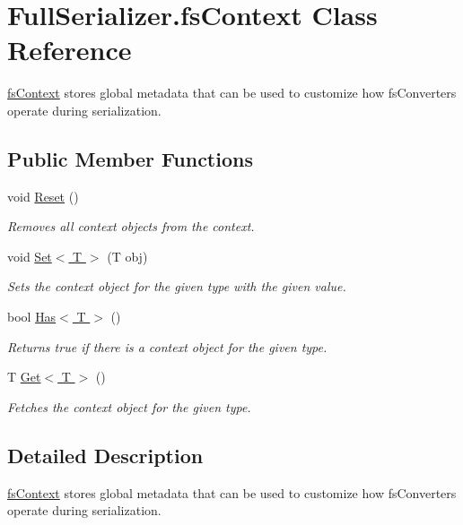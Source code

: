 \hypertarget{class_full_serializer_1_1fs_context}{}\section{Full\+Serializer.\+fs\+Context Class Reference}
\label{class_full_serializer_1_1fs_context}


\hyperlink{class_full_serializer_1_1fs_context}{fs\+Context} stores global metadata that can be used to customize how fs\+Converters operate during serialization.  


\subsection*{Public Member Functions}
\begin{DoxyCompactItemize}
\item 
void \hyperlink{class_full_serializer_1_1fs_context_a8f3833f4c3987347e2e458928d850311}{Reset} ()
\begin{DoxyCompactList}\small\item\em Removes all context objects from the context. \end{DoxyCompactList}\item 
void \hyperlink{class_full_serializer_1_1fs_context_a689299ad9ae689ac177d27ab719f2b2d}{Set$<$ T $>$} (T obj)
\begin{DoxyCompactList}\small\item\em Sets the context object for the given type with the given value. \end{DoxyCompactList}\item 
bool \hyperlink{class_full_serializer_1_1fs_context_a14c6ce0bb8c65b94701a204d7ff93fe4}{Has$<$ T $>$} ()
\begin{DoxyCompactList}\small\item\em Returns true if there is a context object for the given type. \end{DoxyCompactList}\item 
T \hyperlink{class_full_serializer_1_1fs_context_a637b364bdcf19255fbd25f6b58e81983}{Get$<$ T $>$} ()
\begin{DoxyCompactList}\small\item\em Fetches the context object for the given type. \end{DoxyCompactList}\end{DoxyCompactItemize}


\subsection{Detailed Description}
\hyperlink{class_full_serializer_1_1fs_context}{fs\+Context} stores global metadata that can be used to customize how fs\+Converters operate during serialization. 



